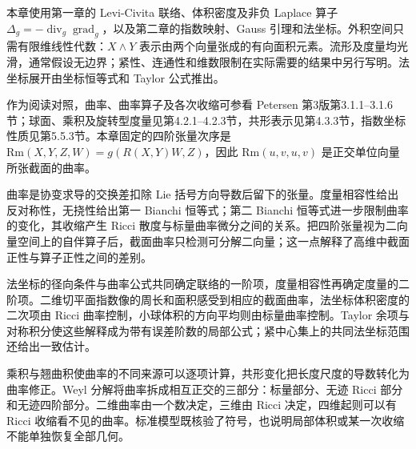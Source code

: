 \ProseParagraphBreak

本章使用第一章的 Levi-Civita 联络、体积密度及非负 Laplace 算子 \(\Delta_g=-\operatorname{div}_g\operatorname{grad}_g\)，以及第二章的指数映射、Gauss 引理和法坐标。外积空间只需有限维线性代数：\(X\wedge Y\) 表示由两个向量张成的有向面积元素。流形及度量均光滑，通常假设无边界；紧性、连通性和维数限制在实际需要的结果中另行写明。法坐标展开由坐标恒等式和 Taylor 公式推出。

\ProseParagraphBreak

作为阅读对照，曲率、曲率算子及各次收缩可参看 Petersen 第3版第3.1.1--3.1.6节；球面、乘积及旋转型度量见第4.2.1--4.2.3节，共形表示见第4.3.3节，指数坐标性质见第5.5.3节\cite[第3.1.1--3.1.6节; 第4.2.1--4.2.3节; 第4.3.3节; 第5.5.3节]{Petersen2016}。本章固定的四阶张量次序是 \(\mathrm{Rm}(X,Y,Z,W)=g(R(X,Y)W,Z)\)，因此 \(\mathrm{Rm}(u,v,u,v)\) 是正交单位向量所张截面的曲率。






\begin{chaptersummary}
	曲率是协变求导的交换差扣除 Lie 括号方向导数后留下的张量。度量相容性给出反对称性，无挠性给出第一 Bianchi 恒等式；第二 Bianchi 恒等式进一步限制曲率的变化，其收缩产生 Ricci 散度与标量曲率微分之间的关系。把四阶张量视为二向量空间上的自伴算子后，截面曲率只检测可分解二向量；这一点解释了高维中截面正性与算子正性之间的差别。

	\ProseParagraphBreak

	法坐标的径向条件与曲率公式共同确定联络的一阶项，度量相容性再确定度量的二阶项。二维切平面指数像的周长和面积感受到相应的截面曲率，法坐标体积密度的二次项由 Ricci 曲率控制，小球体积的方向平均则由标量曲率控制。Taylor 余项与对称积分使这些解释成为带有误差阶数的局部公式；紧中心集上的共同法坐标范围还给出一致估计。

	\ProseParagraphBreak

	乘积与翘曲积使曲率的不同来源可以逐项计算，共形变化把长度尺度的导数转化为曲率修正。Weyl 分解将曲率拆成相互正交的三部分：标量部分、无迹 Ricci 部分和无迹四阶部分。二维曲率由一个数决定，三维由 Ricci 决定，四维起则可以有 Ricci 收缩看不见的曲率。标准模型既核验了符号，也说明局部体积或某一次收缩不能单独恢复全部几何。
\end{chaptersummary}

\BookExercises



